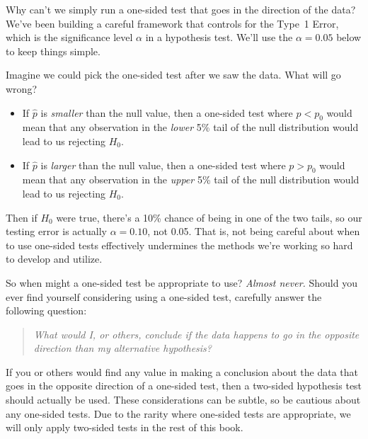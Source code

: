 \begin{example}{Why can't we simply run a one-sided
    test that goes in the direction of the data?}
  We've been building a careful framework that
  controls for the Type~1 Error, which is the
  significance level $\alpha$ in a hypothesis test.
  We'll use the $\alpha = 0.05$ below to keep
  things simple.

  Imagine we could pick the one-sided test after
  we saw the data. What will go wrong?
  \begin{itemize}
  \item If $\hat{p}$ is \emph{smaller} than
      the null value,
      then a one-sided test where $p < p_0$ would
      mean that any observation in the
      \emph{lower} 5\% tail of the null distribution
      would lead to us rejecting $H_0$.
  \item If $\hat{p}$ is \emph{larger} than
      the null value,
      then a one-sided test where $p > p_0$ would
      mean that any observation in the
      \emph{upper} 5\% tail of the null distribution
      would lead to us rejecting $H_0$.
  \end{itemize}
  Then if $H_0$ were true, there's a 10\% chance of
  being in one of the two tails, so our testing error
  is actually $\alpha = 0.10$, not 0.05. That is,
  not being careful about when to use one-sided tests
  effectively undermines the methods we're working
  so hard to develop and utilize.
\end{example}

So when might a one-sided test be appropriate to use?
\emph{Almost never.} Should you ever find
yourself considering using a one-sided test,
carefully answer the following question:
\begin{quote}{\em
  What would I, or others, conclude if the data happens
  to go in the opposite direction than my alternative
  hypothesis?
}\end{quote}
If you or others would find any value in making
a conclusion about the data that goes in the opposite
direction of a one-sided test, then a two-sided hypothesis
test should actually be used. These considerations can
be subtle, so be cautious about any one-sided tests.
Due to the rarity where one-sided tests are appropriate,
we will only apply two-sided tests in the rest of
this book.





